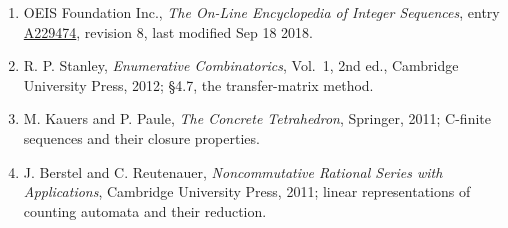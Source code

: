 \documentclass[11pt]{article}
\theoremstyle{definition}
\begin{document}
\begin{enumerate}

\item OEIS Foundation Inc., \emph{The On-Line Encyclopedia of Integer Sequences}, entry \href{https://oeis.org/A229474}{A229474}, revision 8, last modified Sep 18 2018.

\item R. P. Stanley, \emph{Enumerative Combinatorics}, Vol.~1, 2nd ed., Cambridge University Press, 2012; \S4.7, the transfer-matrix method.

\item M. Kauers and P. Paule, \emph{The Concrete Tetrahedron}, Springer, 2011; C-finite sequences and their closure properties.

\item J. Berstel and C. Reutenauer, \emph{Noncommutative Rational Series with Applications}, Cambridge University Press, 2011; linear representations of counting automata and their reduction.

\end{enumerate}
\end{document}
